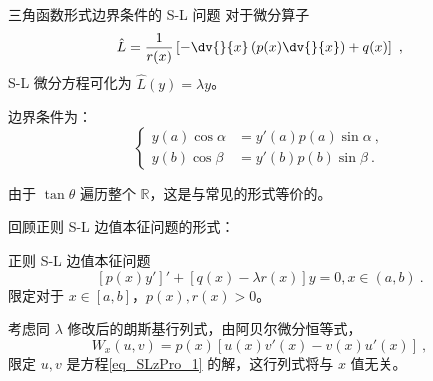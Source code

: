 

\begin{issues}
\issueDraft
\issueTODO
\end{issues}


\begin{definition}{三角函数形式边界条件的 S-L 问题}
对于微分算子
\begin{equation}
\hat L = \frac{1}{r(x)} \left[-\dv{}{x}\left(p(x)\dv{}{x}\right) + q(x)\right] ~,
\end{equation}
S-L 微分方程可化为 $\hat L (y) = \lambda y$。

边界条件为：
\begin{equation}
\left\{\begin{aligned}
y(a) \cos \alpha &= y'(a) p(a) \sin \alpha ~, \\
y(b) \cos \beta &= y'(b) p(b) \sin \beta ~.
\end{aligned}\right.
\end{equation}

由于 $\tan \theta$ 遍历整个 $\mathbb R$，这是与常见的形式等价的。

\end{definition}

回顾正则 S-L 边值本征问题的形式：
\begin{definition}{正则 S-L 边值本征问题}
\begin{equation}\label{eq_SLzPro_1}
[p(x) y']' + [q(x) - \lambda r(x)] y = 0, x \in (a, b) ~.
\end{equation}
限定对于 $x \in [a, b]$，$p(x) , r(x) > 0$。
\end{definition}
考虑同 $\lambda$ 修改后的朗斯基行列式，由阿贝尔微分恒等式，
\begin{equation}
W_x(u, v) = p(x) [u(x) v'(x) - v(x) u'(x)] ~,
\end{equation}
限定 $u, v$ 是方程\autoref{eq_SLzPro_1} 的解，这行列式将与 $x$ 值无关。

